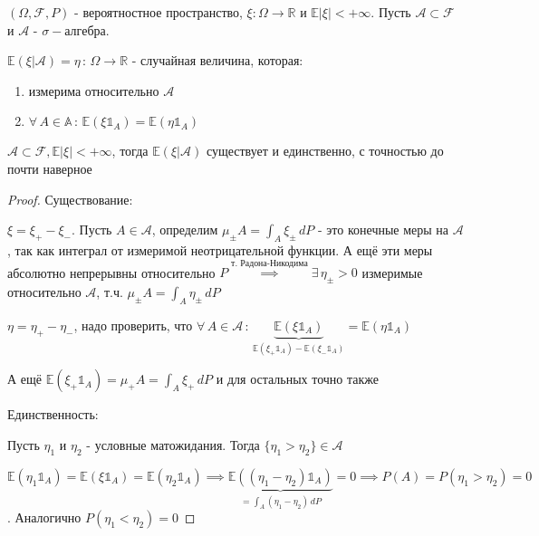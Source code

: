 
\begin{definition}
    $(\Omega, \mathcal{F}, P)$ - вероятностное пространство, $\xi : \Omega \to \mathbb{R}$ и $\mathbb{E} |\xi| < +\infty$. Пусть $\mathcal{A} \subset \mathcal{F}$ и $\mathcal{A}$ - $\sigma-$алгебра.

    $\mathbb{E} (\xi | \mathcal{A}) = \eta \, : \, \Omega \to \mathbb{R}$ - случайная величина, которая:

    \begin{enumerate}
        \item измерима относительно $\mathcal{A}$
        \item $\forall \, A \in \mathbb{A} \, : \, \mathbb{E} (\xi \mathds{1}_A) = \mathbb{E} (\eta \mathds{1}_A)$
    \end{enumerate}
\end{definition}

\begin{theorem}
    $\mathcal{A} \subset \mathcal{F}, \mathbb{E} |\xi| < +\infty$, тогда $\mathbb{E} (\xi | \mathcal{A})$ существует и единственно, с точностью до почти наверное
\end{theorem}

\begin{proof}
    Существование:

    $\xi = \xi_+ - \xi_-$. Пусть $A \in \mathcal{A}$, определим $\mu_{\pm} A = \int_A \xi_{\pm} \, dP$ - это конечные меры на $\mathcal{A}$, так как интеграл от измеримой неотрицательной функции.
    А ещё эти меры абсолютно непрерывны относительно $P \overset{\text{т. Радона-Никодима}}{\implies} \exists \, \eta_{\pm} > 0$ измеримые относительно $\mathcal{A}$, т.ч. $\mu_{\pm} A = \int_A \eta_{\pm} \, dP$
    
    $\eta = \eta_+ - \eta_-$, надо проверить, что $\forall \, A \in \mathcal{A} \, : \, \underbrace{\mathbb{E} (\xi \mathds{1}_A)}_{\mathbb{E}(\xi_+ \mathds{1}_A) - \mathbb{E}(\xi_- \mathds{1}_A)} = \mathbb{E} (\eta \mathds{1}_A)$

    А ещё $\mathbb{E}(\xi_+ \mathds{1}_A) = \mu_+ A = \int_A \xi_+ \, dP$ и для остальных точно также

    Единственность:

    Пусть $\eta_1$ и $\eta_2$ - условные матожидания. Тогда $\{ \eta_1 > \eta_2 \} \in \mathcal{A}$

    $\mathbb{E} (\eta_1 \mathds{1}_A) = \mathbb{E} (\xi \mathds{1}_A) = \mathbb{E} (\eta_2 \mathds{1}_A) \implies \underbrace{\mathbb{E} ((\eta_1 - \eta_2) \mathds{1}_A)}_{=\int_A (\eta_1 - \eta_2) \, dP} = 0 \implies P(A) = P(\eta_1 > \eta_2) = 0$. Аналогично $P(\eta_1 < \eta_2) = 0$
\end{proof}

